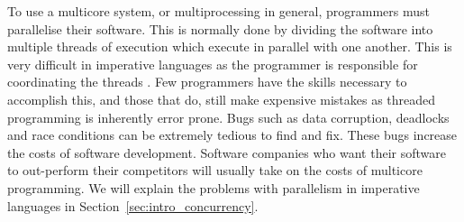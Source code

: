 To use a multicore system, or multiprocessing in general,
programmers must parallelise their software.
This is normally done by dividing the software into multiple threads of
execution
which execute in parallel with one another.
This is very difficult in imperative languages as the programmer is
responsible for coordinating the threads \citep{sutter:2005:concurrency}.
Few programmers have the skills necessary to accomplish this,
and those that do, still make expensive mistakes as
threaded programming is inherently error prone. 
Bugs such as data corruption, deadlocks and race conditions
can be extremely tedious to find and fix.
These bugs increase the costs of software development.
Software companies who want their software to out-perform their competitors
will usually take on the costs of multicore programming.
We will explain the problems with parallelism in imperative languages in
Section~\ref{sec:intro_concurrency}.

